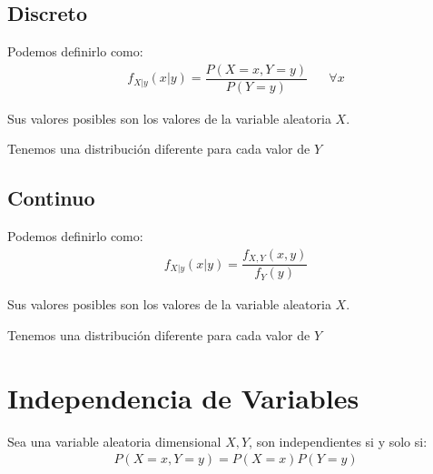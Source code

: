 \documentclass[12pt, fleqn]{report}                             %
\DeclareMathOperator \Space     {\quad}                         %
\theoremstyle{break}                                            %
\begin{document}
            \subsection{Discreto}

                Podemos definirlo como:
                \begin{align*}
                    f_{X | y}(x | y) = \dfrac{P(X = x, Y = y)}{P(Y = y)} \Space \forall x
                \end{align*}

                Sus valores posibles son los valores de la variable aleatoria $X$.

                Tenemos una distribución diferente para cada valor de $Y$


            \subsection{Continuo}

                Podemos definirlo como:
                \begin{align*}
                    f_{X | y}(x | y) = \dfrac{f_{X, Y}(x, y)}{f_{Y}(y)}
                \end{align*}

                Sus valores posibles son los valores de la variable aleatoria $X$.

                Tenemos una distribución diferente para cada valor de $Y$



        \clearpage
        \section{Independencia de Variables}

            Sea una variable aleatoria dimensional $X, Y$, son independientes
            si y solo si:
            \begin{align*}
                P(X = x , Y = y) = P(X = x) P(Y = y)
             \end{align*} 
\end{document}
